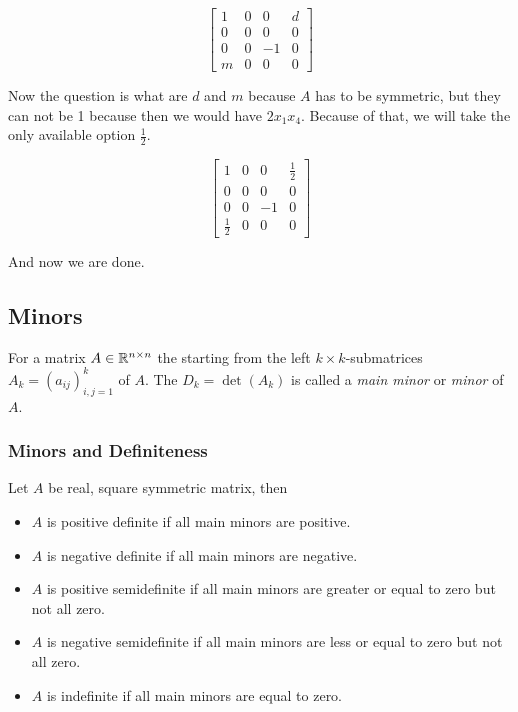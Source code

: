\[
    \begin{bmatrix}
        1 & 0 & 0 & d \\
        0 & 0 & 0 & 0 \\
        0 & 0 & -1 & 0 \\
        m & 0 & 0 & 0  
    \end{bmatrix}
\]

Now the question is what are \(d\) and \(m\) because \(A\) has to be symmetric, but they can not be 1 
because then we would have \(2x_1 x_4\). Because of that, we will take the only available option 
\(\frac{1}{2}\).

\[
    \begin{bmatrix}
        1 & 0 & 0 & \frac{1}{2} \\
        0 & 0 & 0 & 0 \\
        0 & 0 & -1 & 0 \\
        \frac{1}{2} & 0 & 0 & 0  
    \end{bmatrix}
\]

And now we are done.

\subsection{Minors}

For a matrix \(A \in \mathbb{R}^{n \times n}\) the starting from the left \(k \times k\)-submatrices 
\(A_k = (a_{ij})_{i,j=1}^{k}\) of \(A\). The \(D_k  = \det(A_k)\) is called a \emph{main minor} or 
\emph{minor} of \(A\).

\subsubsection{Minors and Definiteness}

Let \(A\) be real, square symmetric matrix, then

\begin{itemize}
    
    \item \(A\) is positive definite if all main minors are positive.

    \item \(A\) is negative definite if all main minors are negative.

    \item \(A\) is positive semidefinite if all main minors are greater or equal to zero but not all zero. 

    \item \(A\) is negative semidefinite if all main minors are less or equal to zero but not all zero.

    \item \(A\) is indefinite if all main minors are equal to zero.

\end{itemize}

